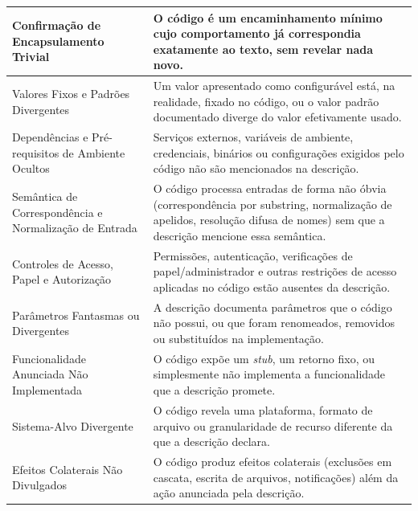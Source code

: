 \begin{table}[htbp]
\begin{tabular}{|p{4.3cm}|p{8.7cm}|}
Confirmação de Encapsulamento Trivial & O código é um encaminhamento mínimo cujo comportamento já correspondia exatamente ao texto, sem revelar nada novo. \\ \hline
Valores Fixos e Padrões Divergentes & Um valor apresentado como configurável está, na realidade, fixado no código, ou o valor padrão documentado diverge do valor efetivamente usado. \\ \hline
Dependências e Pré-requisitos de Ambiente Ocultos & Serviços externos, variáveis de ambiente, credenciais, binários ou configurações exigidos pelo código não são mencionados na descrição. \\ \hline
Semântica de Correspondência e Normalização de Entrada & O código processa entradas de forma não óbvia (correspondência por substring, normalização de apelidos, resolução difusa de nomes) sem que a descrição mencione essa semântica. \\ \hline
Controles de Acesso, Papel e Autorização & Permissões, autenticação, verificações de papel/administrador e outras restrições de acesso aplicadas no código estão ausentes da descrição. \\ \hline
Parâmetros Fantasmas ou Divergentes & A descrição documenta parâmetros que o código não possui, ou que foram renomeados, removidos ou substituídos na implementação. \\ \hline
Funcionalidade Anunciada Não Implementada & O código expõe um \textit{stub}, um retorno fixo, ou simplesmente não implementa a funcionalidade que a descrição promete. \\ \hline
Sistema-Alvo Divergente & O código revela uma plataforma, formato de arquivo ou granularidade de recurso diferente da que a descrição declara. \\ \hline
Efeitos Colaterais Não Divulgados & O código produz efeitos colaterais (exclusões em cascata, escrita de arquivos, notificações) além da ação anunciada pela descrição. \\ \hline
\end{tabular}
\end{table}

